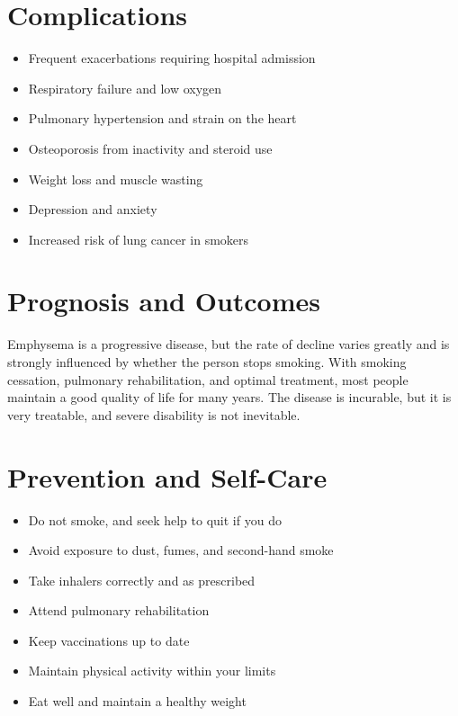 \section*{Complications}
\begin{itemize}
    \item Frequent exacerbations requiring hospital admission
    \item Respiratory failure and low oxygen
    \item Pulmonary hypertension and strain on the heart
    \item Osteoporosis from inactivity and steroid use
    \item Weight loss and muscle wasting
    \item Depression and anxiety
    \item Increased risk of lung cancer in smokers
\end{itemize}

\section*{Prognosis and Outcomes}
Emphysema is a progressive disease, but the rate of decline varies greatly and is strongly influenced by whether the person stops smoking. With smoking cessation, pulmonary rehabilitation, and optimal treatment, most people maintain a good quality of life for many years. The disease is incurable, but it is very treatable, and severe disability is not inevitable.

\section*{Prevention and Self-Care}
\begin{itemize}
    \item Do not smoke, and seek help to quit if you do
    \item Avoid exposure to dust, fumes, and second-hand smoke
    \item Take inhalers correctly and as prescribed
    \item Attend pulmonary rehabilitation
    \item Keep vaccinations up to date
    \item Maintain physical activity within your limits
    \item Eat well and maintain a healthy weight
\end{itemize}

